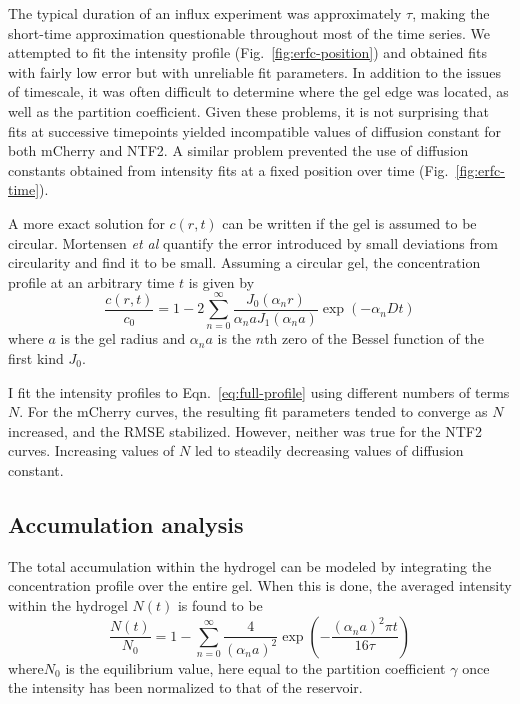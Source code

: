 The typical duration of an influx experiment was approximately $\tau$, making the short-time approximation questionable throughout most of the time series.  We attempted to fit the intensity profile (Fig.~\ref{fig:erfc-position}) and obtained fits with fairly low error but with unreliable fit parameters.  In addition to the issues of timescale, it was often difficult to determine where the gel edge was located, as well as the partition coefficient.  Given these problems, it is not surprising that fits at successive timepoints yielded incompatible values of diffusion constant for both mCherry and NTF2.  A similar problem prevented the use of diffusion constants obtained from intensity fits at a fixed position over time (Fig.~\ref{fig:erfc-time}).

A more exact solution for $c(r,t)$ can be written if the gel is assumed to be circular.  Mortensen \textit{et al} quantify the error introduced by small deviations from circularity and find it to be small.  Assuming a circular gel, the concentration profile at an arbitrary time $t$ is given by
\begin{equation}
\frac{c(r,t)}{c_0} = 1 - 2\sum_{n=0}^\infty \frac{J_0(\alpha_n r)}{\alpha_n a J_1(\alpha_n a)}\exp(-\alpha_n D t)
\label{eq:full-profile}
\end{equation}
where $a$ is the gel radius and $\alpha_n a$ is the $n$th zero of the Bessel function of the first kind $J_0$.

I fit the intensity profiles to Eqn.~\ref{eq:full-profile} using different numbers of terms $N$.  For the mCherry curves, the resulting fit parameters tended to converge as $N$ increased, and the RMSE stabilized.  However, neither was true for the NTF2 curves.  Increasing values of $N$ led to steadily decreasing values of diffusion constant.

\subsection{Accumulation analysis}

The total accumulation within the hydrogel can be modeled by integrating the concentration profile over the entire gel.  When this is done, the averaged intensity within the hydrogel $N(t)$ is found to be
\begin{equation}
\frac{N(t)}{N_0} = 1-\sum_{n=0}^\infty \frac{4}{(\alpha_na)^2}\exp\left(-\frac{(\alpha_na)^2\pi t}{16\tau}\right)
\label{eq:full-accumulation}
\end{equation} where$N_0$ is the equilibrium value, here equal to the partition coefficient $\gamma$ once the intensity has been normalized to that of the reservoir.

